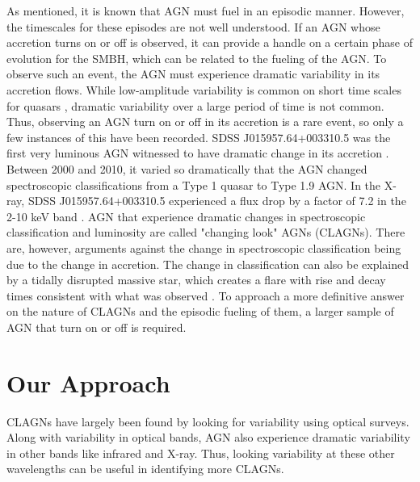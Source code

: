 As mentioned, it is known that AGN must fuel in an episodic manner.
However, the timescales for these episodes are not well understood.
If an AGN whose accretion turns on or off is observed, it can provide a handle on a certain phase of evolution for the SMBH, which can be related to the fueling of the AGN.
To observe such an event, the AGN must experience dramatic variability in its accretion flows.
While low-amplitude variability is common on short time scales for quasars \citep{BlandfordAndMcKee1982}, dramatic variability over a large period of time is not common. 
Thus, observing an AGN turn on or off in its accretion is a rare event, so only a few instances of this have been recorded.
SDSS J015957.64+003310.5 was the first very luminous AGN witnessed to have dramatic change in its accretion \citep{LaMassa2015}.
Between 2000 and 2010, it varied so dramatically that the AGN changed spectroscopic classifications from a Type 1 quasar to Type 1.9 AGN.
In the X-ray, SDSS J015957.64+003310.5 experienced a flux drop by a factor of 7.2 in the 2-10 keV band \citep{LaMassa2015}.
AGN that experience dramatic changes in spectroscopic classification and luminosity are called "changing look" AGNs (CLAGNs).
There are, however, arguments against the change in spectroscopic classification being due to the change in accretion.
The change in classification can also be explained by a tidally disrupted massive star, which creates a flare with rise and decay times consistent with what was observed
\citep{merloni2015}.
To approach a more definitive answer on the nature of CLAGNs and the episodic fueling of them, a larger sample of AGN that turn on or off is required.

\section{Our Approach}
\label{sub1_6}

CLAGNs have largely been found by looking for variability using optical surveys. 
Along with variability in optical bands, AGN also experience dramatic variability in other bands like infrared and X-ray.
Thus, looking variability at these other wavelengths can be useful in identifying more CLAGNs.

